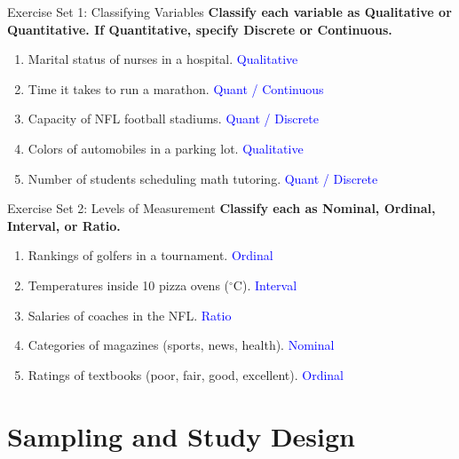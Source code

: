 \documentclass[aspectratio=169]{beamer}
\begin{document}
\begin{frame}{Exercise Set 1: Classifying Variables}
    \textbf{Classify each variable as Qualitative or Quantitative. If Quantitative, specify Discrete or Continuous.}
    \vspace{0.3cm}
    \begin{enumerate}
        \item Marital status of nurses in a hospital. \pause \hfill \textcolor{blue}{Qualitative}
        \item Time it takes to run a marathon. \pause \hfill \textcolor{blue}{Quant / Continuous}
        \item Capacity of NFL football stadiums. \pause \hfill \textcolor{blue}{Quant / Discrete}
        \item Colors of automobiles in a parking lot. \pause \hfill \textcolor{blue}{Qualitative}
        \item Number of students scheduling math tutoring. \pause \hfill \textcolor{blue}{Quant / Discrete}
    \end{enumerate}
\end{frame}

\begin{frame}{Exercise Set 2: Levels of Measurement}
    \textbf{Classify each as Nominal, Ordinal, Interval, or Ratio.}
    \vspace{0.3cm}
    \begin{enumerate}
        \item Rankings of golfers in a tournament. \pause \hfill \textcolor{blue}{Ordinal}
        \item Temperatures inside 10 pizza ovens ($^\circ$C). \pause \hfill \textcolor{blue}{Interval}
        \item Salaries of coaches in the NFL. \pause \hfill \textcolor{blue}{Ratio}
        \item Categories of magazines (sports, news, health). \pause \hfill \textcolor{blue}{Nominal}
        \item Ratings of textbooks (poor, fair, good, excellent). \pause \hfill \textcolor{blue}{Ordinal}
    \end{enumerate}
\end{frame}

\section{Sampling and Study Design}
\end{document}
